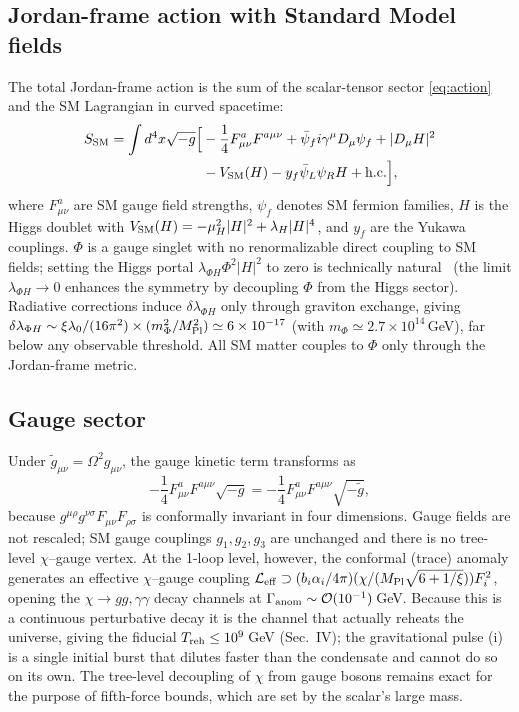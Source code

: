 \documentclass[pdflatex,sn-mathphys-num]{sn-jnl}
\providecommand{\lesssim}{\leq}
\newcommand{\MP}{M_{\rm Pl}}
\theoremstyle{thmstyleone}
\begin{document}
\subsection{Jordan-frame action with Standard Model fields}

The total Jordan-frame action is the sum of the scalar-tensor sector \eqref{eq:action} and the SM Lagrangian in curved spacetime:
\begin{equation}
\begin{aligned}
S_{\rm SM}=\int d^4x\sqrt{-g}\Bigl[&-\frac14 F^a_{\mu\nu}F^{a\mu\nu}+\bar\psi_f i\gamma^\mu D_\mu\psi_f+|D_\mu H|^2\\
&-V_{\rm SM}(H)-y_f\bar\psi_L\psi_R H+{\rm h.c.}\Bigr],
\end{aligned}
\label{eq:SSM}
\end{equation}
where $F^a_{\mu\nu}$ are SM gauge field strengths, $\psi_f$ denotes SM fermion families, $H$ is the Higgs doublet with $V_{\rm SM}(H)=-\mu_H^2|H|^2+\lambda_H|H|^4$, and $y_f$ are the Yukawa couplings. $\Phi$ is a gauge singlet with no renormalizable direct coupling to SM fields; setting the Higgs portal $\lambda_{\Phi H}\Phi^2|H|^2$ to zero is technically natural~\cite{tHooft1980} (the limit $\lambda_{\Phi H}\to0$ enhances the symmetry by decoupling $\Phi$ from the Higgs sector). Radiative corrections induce $\delta\lambda_{\Phi H}$ only through graviton exchange, giving $\delta\lambda_{\Phi H}\sim\xi\lambda_0/(16\pi^2)\times(m_\Phi^2/\MP^2)\simeq6\times10^{-17}$ (with $m_\Phi\simeq2.7\times10^{14}\,$GeV), far below any observable threshold. All SM matter couples to $\Phi$ only through the Jordan-frame metric.

\subsection{Gauge sector}

Under $\tilde g_{\mu\nu}=\Omega^2 g_{\mu\nu}$, the gauge kinetic term transforms as
\begin{equation}
-\frac14 F^a_{\mu\nu}F^{a\mu\nu}\sqrt{-g}=-\frac14 F^a_{\mu\nu}F^{a\mu\nu}\sqrt{-\tilde g},
\label{eq:gaugeconf}
\end{equation}
because $g^{\mu\rho}g^{\nu\sigma}F_{\mu\nu}F_{\rho\sigma}$ is conformally invariant in four dimensions. Gauge fields are not rescaled; SM gauge couplings $g_1,g_2,g_3$ are unchanged and there is no tree-level $\chi$--gauge vertex. At the 1-loop level, however, the conformal (trace) anomaly generates an effective $\chi$--gauge coupling $\mathcal{L}_{\rm eff}\supset(b_i\alpha_i/4\pi)(\chi/(\MP\sqrt{6+1/\xi}))F_i^2$, opening the $\chi\to gg,\gamma\gamma$ decay channels at $\Gamma_{\rm anom}\sim\mathcal{O}(10^{-1})\,$GeV. Because this is a continuous perturbative decay it is the channel that actually reheats the universe, giving the fiducial $T_{\rm reh}\lesssim10^9\,$GeV (Sec.~IV); the gravitational pulse (i) is a single initial burst that dilutes faster than the condensate and cannot do so on its own. The tree-level decoupling of $\chi$ from gauge bosons remains exact for the purpose of fifth-force bounds, which are set by the scalar's large mass.
\end{document}
